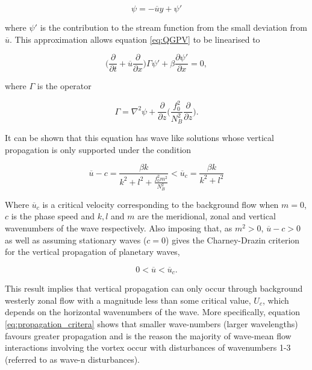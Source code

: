 \begin{equation} \label{eq:Zonal_flow_SF}
\psi = -\overline{u} y + \psi '
\end{equation}

where $\psi'$ is the contribution to the stream function from the small deviation from $\overline{u}$. This approximation allows equation \ref{eq:QGPV} to be linearised to

\begin{equation} \label{eq:Linearised_QGPV}
\bigg(\frac{\partial}{\partial t} + \overline{u} \frac{\partial}{\partial x}\bigg)\Gamma \psi' + \beta \frac{\partial \psi'}{\partial x} = 0,
\end{equation}

where $\Gamma$ is the operator

\begin{equation} \label{eq:ellipse_operator}
\Gamma = \nabla^2 \psi + \frac{\partial}{\partial z}\bigg(\frac{f_0^2}{N_B^2}\frac{\partial}{\partial z}\bigg).
\end{equation}

It can be shown that this equation has wave like solutions whose vertical propagation is only supported under the condition

\begin{equation} \label{eq:propagation_critera}
\overline{u} - c = \frac{\beta k}{k^2 + l^2 + \frac{f_0^2 m^2}{N_B^2}} < \overline{u}_c = \frac{\beta k}{k^2 + l^2}
\end{equation}

Where $\overline{u}_c$ is a critical velocity corresponding to the background flow when $m = 0$, $c$ is the phase speed and $k, l$ and $m$ are the meridional, zonal and vertical wavenumbers of the wave respectively. Also imposing that, as $m^2 > 0$, $\overline{u} - c > 0$ as well as assuming stationary waves ($c = 0$) gives the Charney-Drazin criterion for the vertical propagation of planetary waves,

\begin{equation} \label{eq:Charney-Drazin}
0 < \overline{u} < \overline{u}_c.
\end{equation}

This result implies that vertical propagation can only occur through background westerly zonal flow with a magnitude less than some critical value, $U_c$, which depends on the horizontal wavenumbers of the wave. More specifically, equation \ref{eq:propagation_critera} shows that smaller wave-numbers (larger wavelengths) favours greater propagation and is the reason the majority of wave-mean flow interactions involving the vortex occur with disturbances of wavenumbers 1-3 (referred to as wave-n disturbances). 

